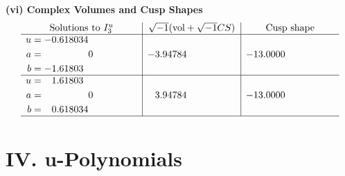 \documentclass[1p]{elsarticle_modified}
\theoremstyle{definition}
\newcommand{\I}{\sqrt{-1}}
\begin{document}
\newpage\flushleft \textbf{(vi) Complex Volumes and Cusp Shapes}
$$\begin{array}{c|c|c}  
\text{Solutions to }I^u_{3}& \I (\text{vol} + \sqrt{-1}CS) & \text{Cusp shape}\\
 \hline 
\begin{aligned}
u &= -0.618034\phantom{ +0.000000I} \\
a &= \phantom{-0.000000 } 0 \\
b &= -1.61803\phantom{ +0.000000I}\end{aligned}
 & -3.94784\phantom{ +0.000000I} & -13.0000\phantom{ +0.000000I} \\ \hline\begin{aligned}
u &= \phantom{-}1.61803\phantom{ +0.000000I} \\
a &= \phantom{-0.000000 } 0 \\
b &= \phantom{-}0.618034\phantom{ +0.000000I}\end{aligned}
 & \phantom{-}3.94784\phantom{ +0.000000I} & -13.0000\phantom{ +0.000000I}\\
 \hline 
 \end{array}$$\newpage
\newpage\renewcommand{\arraystretch}{1}
\centering \section*{ IV. u-Polynomials}
\end{document}
